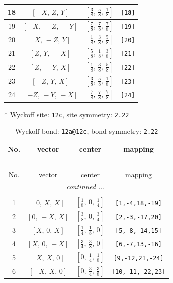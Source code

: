\documentclass[fleqn,8pt]{jsarticle}
\begin{document}
\begin{longtable}{cccc}
18 & $\left[ - X,\, Z,\, Y \right]$ & $\left[ \frac{3}{8},\, \frac{5}{8},\, \frac{1}{8} \right]$ & {\tt [18]} \\ \hline
19 & $\left[ - X,\, - Z,\, - Y \right]$ & $\left[ \frac{7}{8},\, \frac{7}{8},\, \frac{7}{8} \right]$ & {\tt [19]} \\ \hline
20 & $\left[ X,\, - Z,\, Y \right]$ & $\left[ \frac{1}{8},\, \frac{3}{8},\, \frac{5}{8} \right]$ & {\tt [20]} \\ \hline
21 & $\left[ Z,\, Y,\, - X \right]$ & $\left[ \frac{5}{8},\, \frac{1}{8},\, \frac{3}{8} \right]$ & {\tt [21]} \\ \hline
22 & $\left[ Z,\, - Y,\, X \right]$ & $\left[ \frac{1}{8},\, \frac{3}{8},\, \frac{5}{8} \right]$ & {\tt [22]} \\ \hline
23 & $\left[ - Z,\, Y,\, X \right]$ & $\left[ \frac{3}{8},\, \frac{5}{8},\, \frac{1}{8} \right]$ & {\tt [23]} \\ \hline
24 & $\left[ - Z,\, - Y,\, - X \right]$ & $\left[ \frac{7}{8},\, \frac{7}{8},\, \frac{7}{8} \right]$ & {\tt [24]} \\
\end{longtable}
* Wyckoff site: {\tt 12c}, site symmetry: {\tt 2.22}
\renewcommand{\arraystretch}{1.2}
\begin{longtable}{cccc}
\caption{Wyckoff bond: {\tt 12a@12c}, bond symmetry: {\tt 2.22}}
 \\
 \hline \hline
No. & vector & center & mapping \\ \hline \endfirsthead

\multicolumn{3}{l}{\tablename\ \thetable{}} \\
 \hline \hline
No. & vector & center & mapping \\ \hline \endhead

 \hline \hline
\multicolumn{3}{r}{\footnotesize\it continued ...} \\ \endfoot

 \hline \hline
\multicolumn{3}{r}{} \\ \endlastfoot

1 & $\left[ 0,\, X,\, X \right]$ & $\left[ \frac{1}{8},\, 0,\, \frac{1}{4} \right]$ & {\tt [1,-4,18,-19]} \\ \hline
2 & $\left[ 0,\, - X,\, X \right]$ & $\left[ \frac{3}{8},\, 0,\, \frac{3}{4} \right]$ & {\tt [2,-3,-17,20]} \\ \hline
3 & $\left[ X,\, 0,\, X \right]$ & $\left[ \frac{1}{4},\, \frac{1}{8},\, 0 \right]$ & {\tt [5,-8,-14,15]} \\ \hline
4 & $\left[ X,\, 0,\, - X \right]$ & $\left[ \frac{3}{4},\, \frac{3}{8},\, 0 \right]$ & {\tt [6,-7,13,-16]} \\ \hline
5 & $\left[ X,\, X,\, 0 \right]$ & $\left[ 0,\, \frac{1}{4},\, \frac{1}{8} \right]$ & {\tt [9,-12,21,-24]} \\ \hline
6 & $\left[ - X,\, X,\, 0 \right]$ & $\left[ 0,\, \frac{3}{4},\, \frac{3}{8} \right]$ & {\tt [10,-11,-22,23]} \\
\end{longtable}
\end{document}
